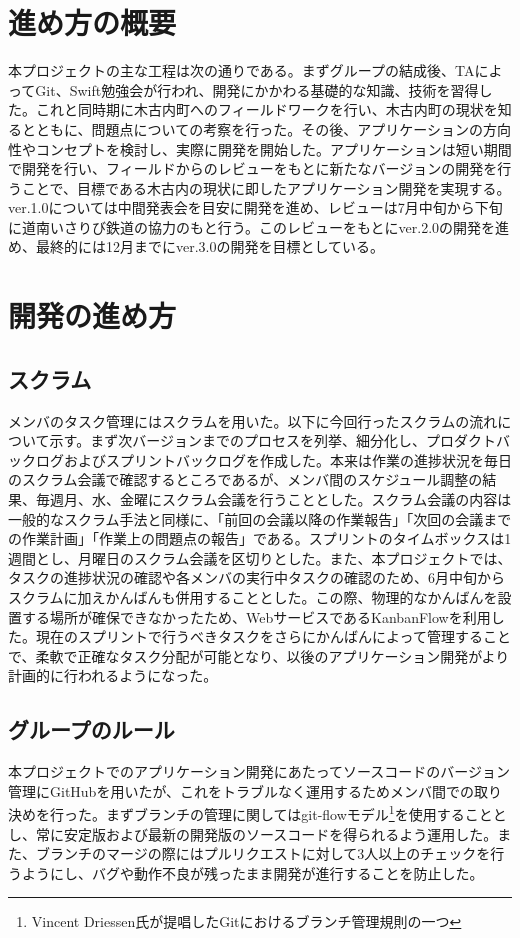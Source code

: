 \documentclass[openany,11pt,papersize]{jsbook}
\begin{document}
\section{進め方の概要}
本プロジェクトの主な工程は次の通りである。まずグループの結成後、TAによってGit、Swift勉強会が行われ、開発にかかわる基礎的な知識、技術を習得した。これと同時期に木古内町へのフィールドワークを行い、木古内町の現状を知るとともに、問題点についての考察を行った。その後、アプリケーションの方向性やコンセプトを検討し、実際に開発を開始した。アプリケーションは短い期間で開発を行い、フィールドからのレビューをもとに新たなバージョンの開発を行うことで、目標である木古内の現状に即したアプリケーション開発を実現する。ver.1.0については中間発表会を目安に開発を進め、レビューは7月中旬から下旬に道南いさりび鉄道の協力のもと行う。このレビューをもとにver.2.0の開発を進め、最終的には12月までにver.3.0の開発を目標としている。

\section{開発の進め方}
\subsection{スクラム}
メンバのタスク管理にはスクラムを用いた。以下に今回行ったスクラムの流れについて示す。まず次バージョンまでのプロセスを列挙、細分化し、プロダクトバックログおよびスプリントバックログを作成した。本来は作業の進捗状況を毎日のスクラム会議で確認するところであるが、メンバ間のスケジュール調整の結果、毎週月、水、金曜にスクラム会議を行うこととした。スクラム会議の内容は一般的なスクラム手法と同様に、「前回の会議以降の作業報告」「次回の会議までの作業計画」「作業上の問題点の報告」である。スプリントのタイムボックスは1週間とし、月曜日のスクラム会議を区切りとした。また、本プロジェクトでは、タスクの進捗状況の確認や各メンバの実行中タスクの確認のため、6月中旬からスクラムに加えかんばんも併用することとした。この際、物理的なかんばんを設置する場所が確保できなかったため、WebサービスであるKanbanFlowを利用した。現在のスプリントで行うべきタスクをさらにかんばんによって管理することで、柔軟で正確なタスク分配が可能となり、以後のアプリケーション開発がより計画的に行われるようになった。

\subsection{グループのルール}
本プロジェクトでのアプリケーション開発にあたってソースコードのバージョン管理にGitHubを用いたが、これをトラブルなく運用するためメンバ間での取り決めを行った。まずブランチの管理に関してはgit-flowモデル\footnote{Vincent Driessen氏が提唱したGitにおけるブランチ管理規則の一つ}を使用することとし、常に安定版および最新の開発版のソースコードを得られるよう運用した。また、ブランチのマージの際にはプルリクエストに対して3人以上のチェックを行うようにし、バグや動作不良が残ったまま開発が進行することを防止した。
\end{document}
